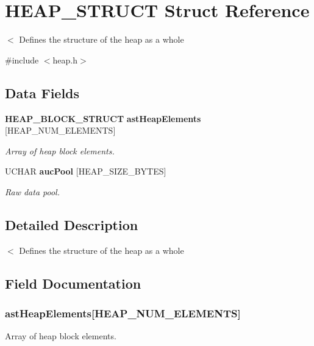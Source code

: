 \section{HEAP\_\-STRUCT Struct Reference}
\label{struct_h_e_a_p___s_t_r_u_c_t}


$<$ Defines the structure of the heap as a whole  


{\ttfamily \#include $<$heap.h$>$}\subsection*{Data Fields}
\begin{DoxyCompactItemize}
\item 
{\bf HEAP\_\-BLOCK\_\-STRUCT} {\bf astHeapElements} [HEAP\_\-NUM\_\-ELEMENTS]
\begin{DoxyCompactList}\small\item\em Array of heap block elements. \item\end{DoxyCompactList}\item 
UCHAR {\bf aucPool} [HEAP\_\-SIZE\_\-BYTES]
\begin{DoxyCompactList}\small\item\em Raw data pool. \item\end{DoxyCompactList}\end{DoxyCompactItemize}


\subsection{Detailed Description}
$<$ Defines the structure of the heap as a whole 

\subsection{Field Documentation}
\subsubsection[{astHeapElements}]{ {\bf astHeapElements}[HEAP\_\-NUM\_\-ELEMENTS]}\label{struct_h_e_a_p___s_t_r_u_c_t_a3e7430e290c871e469520fe3e1217ce7}


Array of heap block elements. 
